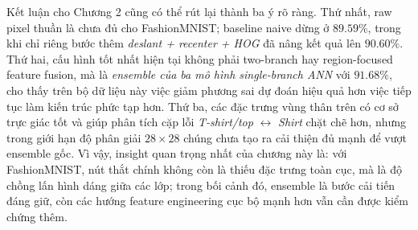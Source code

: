 Kết luận cho Chương 2 cũng có thể rút lại thành ba ý rõ ràng. Thứ nhất, raw pixel thuần là chưa đủ cho FashionMNIST; baseline naive dừng ở $89.59\%$, trong khi chỉ riêng bước thêm \textit{deslant + recenter + HOG} đã nâng kết quả lên $90.60\%$. Thứ hai, cấu hình tốt nhất hiện tại không phải two-branch hay region-focused feature fusion, mà là \textit{ensemble của ba mô hình single-branch ANN} với $91.68\%$, cho thấy trên bộ dữ liệu này việc giảm phương sai dự đoán hiệu quả hơn việc tiếp tục làm kiến trúc phức tạp hơn. Thứ ba, các đặc trưng vùng thân trên có cơ sở trực giác tốt và giúp phân tích cặp lỗi \textit{T-shirt/top} $\leftrightarrow$ \textit{Shirt} chặt chẽ hơn, nhưng trong giới hạn độ phân giải $28 \times 28$ chúng chưa tạo ra cải thiện đủ mạnh để vượt ensemble gốc. Vì vậy, insight quan trọng nhất của chương này là: với FashionMNIST, nút thắt chính không còn là thiếu đặc trưng toàn cục, mà là độ chồng lấn hình dáng giữa các lớp; trong bối cảnh đó, ensemble là bước cải tiến đáng giữ, còn các hướng feature engineering cục bộ mạnh hơn vẫn cần được kiểm chứng thêm.
